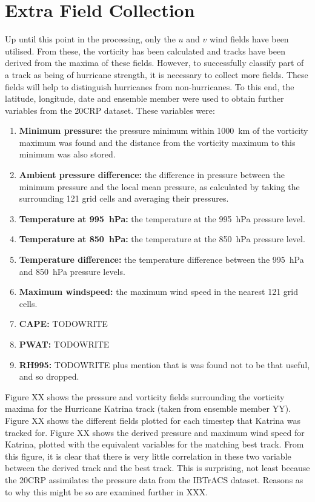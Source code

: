 \documentclass[pdftex,12pt,a4paper]{report}
\begin{document}

\newpage
\section{Extra Field Collection}

Up until this point in the processing, only the $u$ and $v$ wind fields have been utilised. From
these, the vorticity has been calculated and tracks have been derived from the maxima of these
fields.  However, to successfully classify part of a track as being of hurricane strength, it is
necessary to collect more fields. These fields will help to distinguish hurricanes from
non-hurricanes. To this end, the latitude, longitude, date and ensemble member were used to obtain
further variables from the 20CRP dataset. These variables were:

\begin{enumerate}
    \item \textbf{Minimum pressure:} the pressure minimum within \SI{1000}{km} of the vorticity
        maximum was found and the distance from the vorticity maximum to this minimum was also stored.
    \item \textbf{Ambient pressure difference:} the difference in pressure between the minimum
        pressure and the local mean pressure, as calculated by taking the surrounding 121 grid cells
        and averaging their pressures.
    \item \textbf{Temperature at \SI{995}{hPa}:} the temperature at the \SI{995}{hPa} pressure
        level.
    \item \textbf{Temperature at \SI{850}{hPa}:} the temperature at the \SI{850}{hPa} pressure
        level.
    \item \textbf{Temperature difference:} the temperature difference between the \SI{995}{hPa} and
        \SI{850}{hPa} pressure levels.
    \item \textbf{Maximum windspeed:} the maximum wind speed in the nearest 121 grid cells.
    \item \textbf{CAPE:} TODOWRITE
    \item \textbf{PWAT:} TODOWRITE
    \item \textbf{RH995:} TODOWRITE plus mention that is was found not to be that useful, and so dropped.
\end{enumerate}

Figure XX shows the pressure and vorticity fields surrounding the vorticity maxima for the Hurricane
Katrina track (taken from ensemble member YY). Figure XX shows the different fields plotted for each
timestep that Katrina was tracked for. Figure XX shows the derived pressure and maximum wind speed
for Katrina, plotted with the equivalent variables for the matching best track. From this figure, it
is clear that there is very little correlation in these two variable between the derived track and
the best track. This is surprising, not least because the 20CRP assimilates the pressure data from
the IBTrACS dataset. Reasons as to why this might be so are examined further in XXX.
\end{document}
